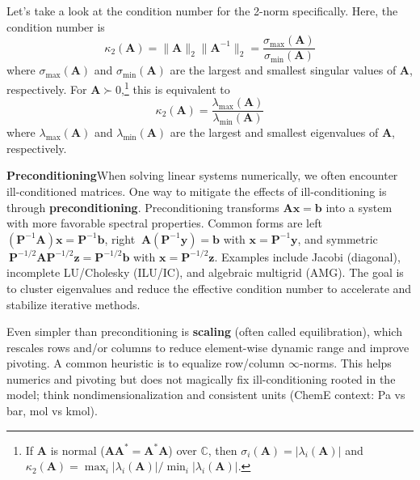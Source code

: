 Let's take a look at the condition number for the 2-norm specifically. Here, the condition number is
\begin{equation*}
    \kappa_2(\mathbf{A}) = \|\mathbf{A}\|_2 \|\mathbf{A}^{-1}\|_2 = \frac{\sigma_{\text{max}}(\mathbf{A})}{\sigma_{\text{min}}(\mathbf{A})}
\end{equation*}
where $\sigma_{\text{max}}(\mathbf{A})$ and $\sigma_{\text{min}}(\mathbf{A})$ are the largest and smallest singular values of $\mathbf{A}$, respectively. For $\mathbf{A} \succ 0$,\footnote{If $\mathbf{A}$ is normal ($\mathbf{A}\mathbf{A}^* = \mathbf{A}^*\mathbf{A}$) over $\mathbb{C}$, then $\sigma_i(\mathbf{A}) = |\lambda_i(\mathbf{A})|$ and $\kappa_2(\mathbf{A}) = \max_i |\lambda_i(\mathbf{A})|/\min_i |\lambda_i(\mathbf{A})|$.} this is equivalent to
\begin{equation*}
    \kappa_2(\mathbf{A}) = \frac{\lambda_{\text{max}}(\mathbf{A})}{\lambda_{\text{min}}(\mathbf{A})}
\end{equation*}
where $\lambda_{\text{max}}(\mathbf{A})$ and $\lambda_{\text{min}}(\mathbf{A})$ are the largest and smallest eigenvalues of $\mathbf{A}$, respectively.

\textbf{Preconditioning}\quad When solving linear systems numerically, we often encounter ill-conditioned matrices. One way to mitigate the effects of ill-conditioning is through \textbf{preconditioning}. Preconditioning transforms $ \mathbf{A}\mathbf{x} = \mathbf{b} $ into a system with more favorable spectral properties. Common forms are left $(\mathbf{P}^{-1}\mathbf{A})\mathbf{x} = \mathbf{P}^{-1}\mathbf{b}$, right $\ \mathbf{A}(\mathbf{P}^{-1}\mathbf{y}) = \mathbf{b}$ with $\mathbf{x}=\mathbf{P}^{-1}\mathbf{y}$, and symmetric $\ \mathbf{P}^{-1/2}\mathbf{A}\mathbf{P}^{-1/2}\mathbf{z} = \mathbf{P}^{-1/2}\mathbf{b}$ with $\mathbf{x}=\mathbf{P}^{-1/2}\mathbf{z}$. Examples include Jacobi (diagonal), incomplete LU/Cholesky (ILU/IC), and algebraic multigrid (AMG). The goal is to cluster eigenvalues and reduce the effective condition number to accelerate and stabilize iterative methods.

Even simpler than preconditioning is \textbf{scaling} (often called equilibration), which rescales rows and/or columns to reduce element-wise dynamic range and improve pivoting. A common heuristic is to equalize row/column $\infty$-norms. This helps numerics and pivoting but does not magically fix ill-conditioning rooted in the model; think nondimensionalization and consistent units (ChemE context: Pa vs bar, mol vs kmol).

